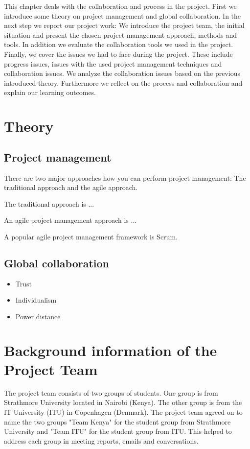 This chapter deals with the collaboration and process in the project. First we introduce some theory on project management and global collaboration. In the next step we report our project work: We introduce the project team, the initial situation and present the chosen project management approach, methods and tools. In addition we evaluate the collaboration tools we used in the project. Finally, we cover the issues we had to face during the project. These include progress issues, issues with the used project management techniques and collaboration issues. We analyze the collaboration issues based on the previous introduced theory. Furthermore we reflect on the process and collaboration and explain our learning outcomes.


\section{Theory}

\subsection{Project management}

There are two major approaches how you can perform project management: The traditional approach and the agile approach.

The traditional approach is ... 

An agile project management approach is ... 

A popular agile project management framework is Scrum. 

\subsection{Global collaboration} 

	\begin{itemize}
		\item Trust
		\item Individualism
		\item Power distance
	\end{itemize}


\section{Background information of the Project Team}
The project team consists of two groups of students. One group is from Strathmore University located in Nairobi (Kenya). The other group is from the IT University (ITU) in Copenhagen (Denmark). The project team agreed on to name the two groups "Team Kenya" for the student group from Strathmore University and "Team ITU" for the student group from ITU. This helped to address each group in meeting reports, emails and conversations.

